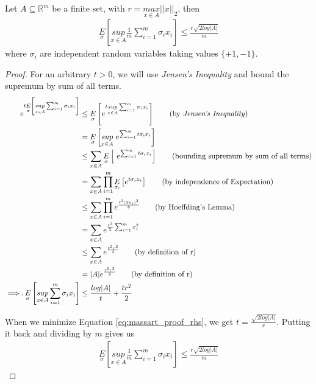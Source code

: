 \documentclass[../toml]{subfiles}
\begin{document}
\begin{theorem} \label{th:massart}
Let $A \subseteq \mathbb{R}^m$ be a finite set, with $r = \underset{x \in A}{max} || x ||_2$,
then
\begin{align}
\underset{\sigma}{E}\left[ \underset{x \in A}{sup} \frac{1}{m} \sum_{i=1}^{m} \sigma_i x_i \right] \leq \frac{r \sqrt{2 log |A|}}{m}
\end{align}
where $\sigma_i$ are independent random variables taking values $\{+1,-1\}$.
\end{theorem}
\begin{proof}
For an arbitrary $t>0$, we will use \textit{Jensen's Inequality} and bound the supremum by
sum of all terms.
\begin{align}
e^{t\underset{\sigma}{E}\left[ \underset{x \in A}{sup} \sum_{i=1}^{m} \sigma_i x_i \right]} 
&\leq \underset{\sigma}{E}\left[ e^{t\underset{x \in A}{sup} \sum_{i=1}^{m} \sigma_i x_i} \right] \tag{by \textit{Jensen's Inequality}} \\
&= \underset{\sigma}{E}\left[ \underset{x \in A}{sup} \text{ } e^{\sum_{i=1}^{m} t\sigma_i x_i} \right] \nonumber \\
&\leq \sum_{x \in A} \underset{\sigma}{E}\left[ \text{ } e^{\sum_{i=1}^{m} t\sigma_i x_i} \right] \tag{bounding supremum by sum of all terms} \\
&= \sum_{x \in A} \prod_{i=1}^{m} \underset{\sigma_i}{E}\left[ e^{t\sigma_i x_i} \right] \tag{by independence of Expectation} \\
&\leq \sum_{x \in A} \prod_{i=1}^{m}  e^{\frac{t^2 (2x_i)^2}{8}} \tag{by Hoeffding's Lemma} \\
&= \sum_{x \in A} e^{\frac{t^2}{2} \sum_{i=1}^{m} x_i^2} \nonumber \\
&\leq \sum_{x \in A} e^{\frac{t^2r^2}{2}} \tag{by definition of r} \\
&= |A| e^{\frac{t^2r^2}{2}} \tag{by definition of r} \\
\implies, \underset{\sigma}{E}\left[ \underset{x \in A}{sup} \sum_{i=1}^{m} \sigma_i x_i \right] &\leq \frac{log |A|}{t} + \frac{tr^2}{2} \label{eq:massart_proof_rhs}
\end{align}

When we minimize Equation \ref{eq:massart_proof_rhs}, we get $t = \frac{\sqrt{2log|A|}}{r}$.
Putting it back and dividing by $m$ gives us
\begin{align}
\underset{\sigma}{E}\left[ \underset{x \in A}{sup} \frac{1}{m} \sum_{i=1}^{m} \sigma_i x_i \right] \leq \frac{r \sqrt{2 log |A|}}{m}
\end{align}
\end{proof}
\end{document}
